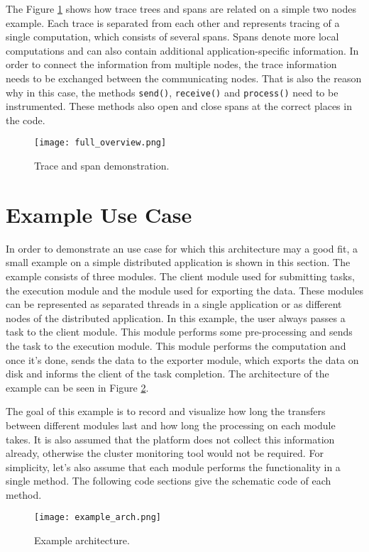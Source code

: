 The Figure \ref{fig:full_overview} shows how trace trees and spans are related on a simple two nodes example. Each trace is separated from each other and represents tracing of a single computation, which consists of several spans. Spans denote more local computations and can also contain additional application-specific information. In order to connect the information from multiple nodes, the trace information needs to be exchanged between the communicating nodes. That is also the reason why in this case, the methods \texttt{send()}, \texttt{receive()} and \texttt{process()} need to be instrumented. These methods also open and close spans at the correct places in the code.
\begin{figure}
	\centering
	\texttt{[image: full\_overview.png]}
	\caption{Trace and span demonstration. }
	\label{fig:full_overview}
\end{figure}
\section{Example Use Case}
\label{design:use_case}
In order to demonstrate an use case for which this architecture may a good fit, a small example on a simple distributed application is shown in this section. The example consists of three modules. The client module used for submitting tasks, the execution module and the module used for exporting the data. These modules can be represented as separated threads in a single application or as different nodes of the distributed application. In this example, the user always passes a task to the client module. This module performs some pre-processing and sends the task to the execution module. This module performs the computation and once it's done, sends the data to the exporter module, which exports the data on disk and informs the client of the task completion. The architecture of the example can be seen in Figure \ref{fig:example_arch}.

The goal of this example is to record and visualize how long the transfers between different modules last and how long the processing on each module takes. It is also assumed that the platform does not collect this information already, otherwise the cluster monitoring tool would not be required. For simplicity, let's also assume that each module performs the functionality in a single method. The following code sections give the schematic code of each method.

	\begin{figure}
		\centering
		\texttt{[image: example\_arch.png]}
		\caption{Example architecture.}
		\label{fig:example_arch}
	\end{figure}



